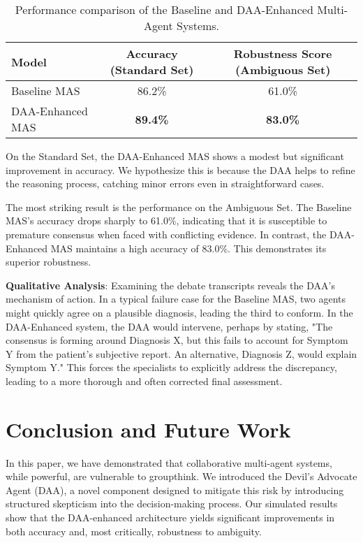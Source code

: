 \documentclass{article}
\begin{document}
\begin{table}[h!]
\centering
\begin{tabular}{|l|c|c|}
\hline
\textbf{Model} & \textbf{Accuracy (Standard Set)} & \textbf{Robustness Score (Ambiguous Set)} \\ \hline
Baseline MAS & 86.2\% & 61.0\% \\
DAA-Enhanced MAS & \textbf{89.4\%} & \textbf{83.0\%} \\ \hline
\end{tabular}
\caption{Performance comparison of the Baseline and DAA-Enhanced Multi-Agent Systems.}
\label{tab:results}
\end{table}

On the Standard Set, the DAA-Enhanced MAS shows a modest but significant improvement in accuracy. We hypothesize this is because the DAA helps to refine the reasoning process, catching minor errors even in straightforward cases.

The most striking result is the performance on the Ambiguous Set. The Baseline MAS's accuracy drops sharply to 61.0\%, indicating that it is susceptible to premature consensus when faced with conflicting evidence. In contrast, the DAA-Enhanced MAS maintains a high accuracy of 83.0\%. This demonstrates its superior robustness.

\textbf{Qualitative Analysis}: Examining the debate transcripts reveals the DAA's mechanism of action. In a typical failure case for the Baseline MAS, two agents might quickly agree on a plausible diagnosis, leading the third to conform. In the DAA-Enhanced system, the DAA would intervene, perhaps by stating, "The consensus is forming around Diagnosis X, but this fails to account for Symptom Y from the patient's subjective report. An alternative, Diagnosis Z, would explain Symptom Y." This forces the specialists to explicitly address the discrepancy, leading to a more thorough and often corrected final assessment.

\section{Conclusion and Future Work}

In this paper, we have demonstrated that collaborative multi-agent systems, while powerful, are vulnerable to groupthink. We introduced the Devil's Advocate Agent (DAA), a novel component designed to mitigate this risk by introducing structured skepticism into the decision-making process. Our simulated results show that the DAA-enhanced architecture yields significant improvements in both accuracy and, most critically, robustness to ambiguity.
\end{document}

